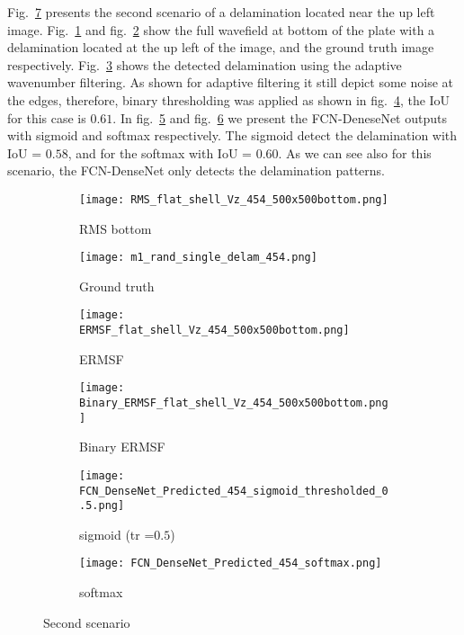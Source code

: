 
	Fig.~\ref{fig:RMS454} presents the second scenario of a delamination located near the up left image.
	Fig.~\ref{fig:dispersion30deg_direct} and fig.~\ref{fig:m1_rand_single_delam_454} show the full wavefield at bottom of the plate with a delamination located at the up left of the image, and the ground truth image respectively.
	Fig.~\ref{fig:ERMSF_flat_shell_Vz_454} shows the detected delamination using the adaptive wavenumber filtering.
	As shown for adaptive filtering it still depict some noise at the edges, therefore, binary thresholding was applied as shown in fig.~\ref{fig:Binary_ERMSF}, the IoU for this case is \(0.61\).
	In fig.~\ref{fig:predict_454_sigmoid_tr_0.5} and fig.~\ref{fig:predict_454_softmax} we present the FCN-DeneseNet outputs with sigmoid and softmax respectively.
	The sigmoid detect the delamination with IoU = \(0.58\), and for the softmax with IoU = \(0.60\).
	As we can see also for this scenario, the FCN-DenseNet only detects the delamination patterns.
	\begin{figure} [h!]
		\centering
		\begin{subfigure}[b]{0.47\textwidth}
			\centering
			\texttt{[image: RMS\_flat\_shell\_Vz\_454\_500x500bottom.png]}
			\caption{RMS bottom}
			\label{fig:dispersion30deg_direct}
		\end{subfigure}
		\hfill
		\begin{subfigure}[b]{0.47\textwidth}
			\centering
			\texttt{[image: m1\_rand\_single\_delam\_454.png]}
			\caption{Ground truth}
			\label{fig:m1_rand_single_delam_454}
		\end{subfigure}
		\hfill
		\begin{subfigure}[b]{0.47\textwidth}
			\centering
			\texttt{[image: ERMSF\_flat\_shell\_Vz\_454\_500x500bottom.png]}
			\caption{ERMSF}
			\label{fig:ERMSF_flat_shell_Vz_454}
		\end{subfigure}
		\hfill
		\begin{subfigure}[b]{0.47\textwidth}
			\centering
			\texttt{[image: Binary\_ERMSF\_flat\_shell\_Vz\_454\_500x500bottom.png]}
			\caption{Binary ERMSF}
			\label{fig:Binary_ERMSF}
		\end{subfigure}
		\hfill
		\begin{subfigure}[b]{0.47\textwidth}
			\centering
			\texttt{[image: FCN\_DenseNet\_Predicted\_454\_sigmoid\_thresholded\_0.5.png]}
			\caption{sigmoid (tr =\(0.5\))}
			\label{fig:predict_454_sigmoid_tr_0.5}
		\end{subfigure}
		\hfill	
		\begin{subfigure}[b]{0.47\textwidth}
			\centering
			\texttt{[image: FCN\_DenseNet\_Predicted\_454\_softmax.png]}
			\caption{softmax}
			\label{fig:predict_454_softmax}
		\end{subfigure}
		\caption{Second scenario}
		\label{fig:RMS454}
	\end{figure} 

